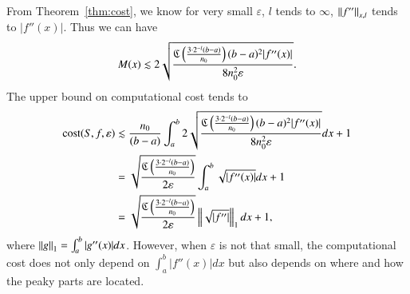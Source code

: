 From Theorem~\ref{thm:cost}, we know for very small $\varepsilon$,
$l$ tends to $\infty$, $\norm[x,l]{f''}$ tends to $|f''(x)|$.
Thus we can have
$$ M(x) \lesssim 2\sqrt{\frac{\fC\left(\frac{3 \cdot 2^{-l}(b-a)}{n_0}\right)  (b-a)^2 |f''(x)|}{8n^2_0\varepsilon}}.$$
The upper bound on computational cost tends to
\begin{align*}
\cost(S,f,\varepsilon)  & \lesssim \frac{n_0}{(b-a)}\int_a^b 2\sqrt{\frac{\fC\left(\frac{3 \cdot 2^{-l}(b-a)}{n_0}\right)  (b-a)^2 |f''(x)|}{8n^2_0\varepsilon}} dx +1 \\
& =\sqrt{\frac{\fC\left(\frac{3 \cdot 2^{-l}(b-a)}{n_0}\right)}{2\varepsilon}}\int_a^b \sqrt{|f''(x)|} dx +1\\
& =\sqrt{\frac{\fC\left(\frac{3 \cdot 2^{-l}(b-a)}{n_0}\right)}{2\varepsilon}}\norm[1]{\sqrt{|f''|}} dx +1,
\end{align*}
where $\norm[1]{g}=\int_a^b |g''(x)| dx$.
However, when $\varepsilon$ is not that small, the computational cost does not only depend on $\int_a^b|f''(x)|dx$ but also depends on where and how the peaky parts are located.\\
